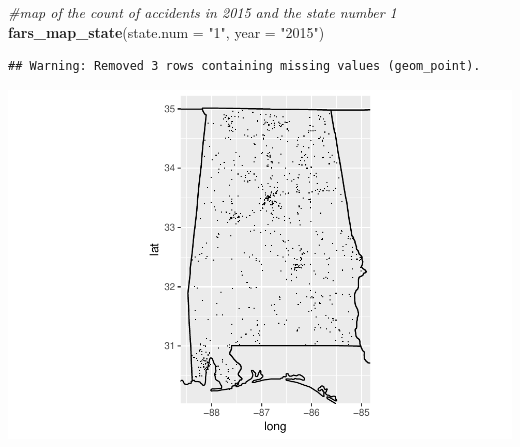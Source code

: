\documentclass[]{article}
\newenvironment{Shaded}{\begin{snugshade}}{\end{snugshade}}
\newcommand{\KeywordTok}[1]{\textcolor[rgb]{0.13,0.29,0.53}{\textbf{{#1}}}}
\newcommand{\DataTypeTok}[1]{\textcolor[rgb]{0.13,0.29,0.53}{{#1}}}
\newcommand{\StringTok}[1]{\textcolor[rgb]{0.31,0.60,0.02}{{#1}}}
\newcommand{\CommentTok}[1]{\textcolor[rgb]{0.56,0.35,0.01}{\textit{{#1}}}}
\newcommand{\NormalTok}[1]{{#1}}
\begin{document}
\begin{Shaded}
\begin{Highlighting}[]
\CommentTok{#map of the count of accidents in 2015 and the state number 1 }
\KeywordTok{fars_map_state}\NormalTok{(}\DataTypeTok{state.num =} \StringTok{"1"}\NormalTok{, }\DataTypeTok{year =} \StringTok{"2015"}\NormalTok{)}
\end{Highlighting}
\end{Shaded}

\begin{verbatim}
## Warning: Removed 3 rows containing missing values (geom_point).
\end{verbatim}

\includegraphics{./tex2pdf.60/7ad3d8f5be3b51a3cd11ba55849c3008ce0aae25.pdf}
\end{document}
